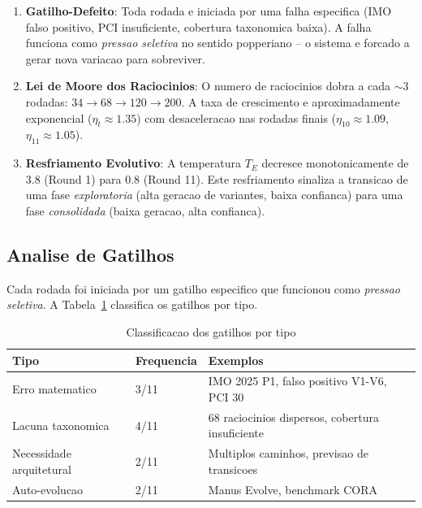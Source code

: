 \documentclass[5p]{elsarticle}
\begin{document}
\begin{enumerate}[label=Padrao \arabic*:]
  \item \textbf{Gatilho-Defeito}: Toda rodada e iniciada por uma falha
    especifica (IMO falso positivo, PCI insuficiente, cobertura taxonomica
    baixa). A falha funciona como \textit{pressao seletiva} no sentido
    popperiano -- o sistema e forcado a gerar nova variacao para sobreviver.

  \item \textbf{Lei de Moore dos Raciocinios}: O numero de raciocinios dobra
    a cada $\sim$3 rodadas: $34 \to 68 \to 120 \to 200$. A taxa de crescimento
    e aproximadamente exponencial ($\eta_t \approx 1.35$) com desaceleracao
    nas rodadas finais ($\eta_{10} \approx 1.09$, $\eta_{11} \approx 1.05$).

  \item \textbf{Resfriamento Evolutivo}: A temperatura $T_E$ decresce
    monotonicamente de $3.8$ (Round 1) para $0.8$ (Round 11). Este
    resfriamento sinaliza a transicao de uma fase \textit{exploratoria}
    (alta geracao de variantes, baixa confianca) para uma fase
    \textit{consolidada} (baixa geracao, alta confianca).
\end{enumerate}

\subsection{Analise de Gatilhos}

Cada rodada foi iniciada por um gatilho especifico que funcionou como
\textit{pressao seletiva}. A Tabela~\ref{tab:gatilhos} classifica os gatilhos por tipo.

\begin{table}[H]
  \centering
  \caption{Classificacao dos gatilhos por tipo}
  \label{tab:gatilhos}
  \begin{tabular}{lp{4cm}p{6cm}}
    \toprule
    \textbf{Tipo} & \textbf{Frequencia} & \textbf{Exemplos} \\
    \midrule
    Erro matematico & 3/11 & IMO 2025 P1, falso positivo V1-V6, PCI 30 \\
    Lacuna taxonomica & 4/11 & 68 raciocinios dispersos, cobertura insuficiente \\
    Necessidade arquitetural & 2/11 & Multiplos caminhos, previsao de transicoes \\
    Auto-evolucao & 2/11 & Manus Evolve, benchmark CORA \\
    \bottomrule
  \end{tabular}
\end{table}
\end{document}
